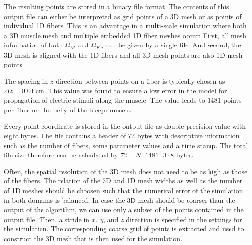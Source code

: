The resulting points are stored in a binary file format. The contents of this output file can either be interpreted as grid points of a 3D mesh or as points of individual 1D fibers. This is an advantage in a multi-scale simulation where both a 3D muscle mesh and multiple embedded 1D fiber meshes occur: First, all mesh information of both $\Omega_M$ and $\Omega_{F,i}$ can be given by a single file. And second, the 3D mesh is aligned with the 1D fibers and all 3D mesh points are also 1D mesh points. 

The spacing in $z$ direction between points on a fiber is typically chosen as $\Delta z = \SI{0.01}{\cm}$. This value was found to ensure a low error in the model for propagation of electric stimuli along the muscle. The value leads to 1481 points per fiber on the belly of the biceps muscle. 

Every point coordinate is stored in the output file as double precision value with eight bytes. The file contains a header of 72 bytes with descriptive information such as the number of fibers, some parameter values and a time stamp. The total file size therefore can be calculated by $72+N\cdot 1481\cdot 3\cdot 8$ bytes.

Often, the spatial resolution of the 3D mesh does not need to be as high as those of the fibers. The relation of the 3D and 1D mesh widths as well as the number of 1D meshes should be choosen such that the numerical error of the simulation in both domains is balanced.
In case the 3D mesh should be coarser than the output of the algorithm, we can use only a subset of the points contained in the output file. Then, a stride in $x$, $y$, and $z$ direction is specified in the settings for the simulation. The corresponding coarse grid of points is extracted and used to construct the 3D mesh that is then used for the simulation.


